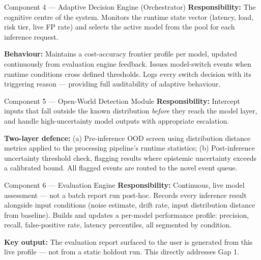 \documentclass[11pt, a4paper]{article}
\begin{document}
\vspace{6pt}

\begin{amberbox}{Component 4 — Adaptive Decision Engine (Orchestrator)}
\textbf{Responsibility:} The cognitive centre of the system.
Monitors the runtime state vector (latency, load, risk tier, live FP rate)
and selects the active model from the pool for each inference request.

\textbf{Behaviour:} Maintains a cost-accuracy frontier profile per model,
updated continuously from evaluation engine feedback.
Issues model-switch events when runtime conditions cross defined thresholds.
Logs every switch decision with its triggering reason — providing
full auditability of adaptive behaviour.
\end{amberbox}

\vspace{6pt}

\begin{redbox}{Component 5 — Open-World Detection Module}
\textbf{Responsibility:} Intercept inputs that fall outside the known distribution
\textit{before} they reach the model layer, and handle high-uncertainty
model outputs with appropriate escalation.

\textbf{Two-layer defence:}
(a) Pre-inference OOD screen using distribution distance metrics applied
to the processing pipeline's runtime statistics;
(b) Post-inference uncertainty threshold check, flagging results where
epistemic uncertainty exceeds a calibrated bound.
All flagged events are routed to the novel event queue.
\end{redbox}

\vspace{6pt}

\begin{infobox}[accentgreen]{Component 6 — Evaluation Engine}
\textbf{Responsibility:} Continuous, live model assessment — not a batch report run post-hoc.
Records every inference result alongside input conditions (noise estimate,
drift rate, input distribution distance from baseline).
Builds and updates a per-model performance profile: precision, recall,
false-positive rate, latency percentiles, all segmented by condition.

\textbf{Key output:} The evaluation report surfaced to the user is generated from
this live profile — not from a static holdout run.
This directly addresses Gap 1.
\end{infobox}

\vspace{6pt}
\end{document}
